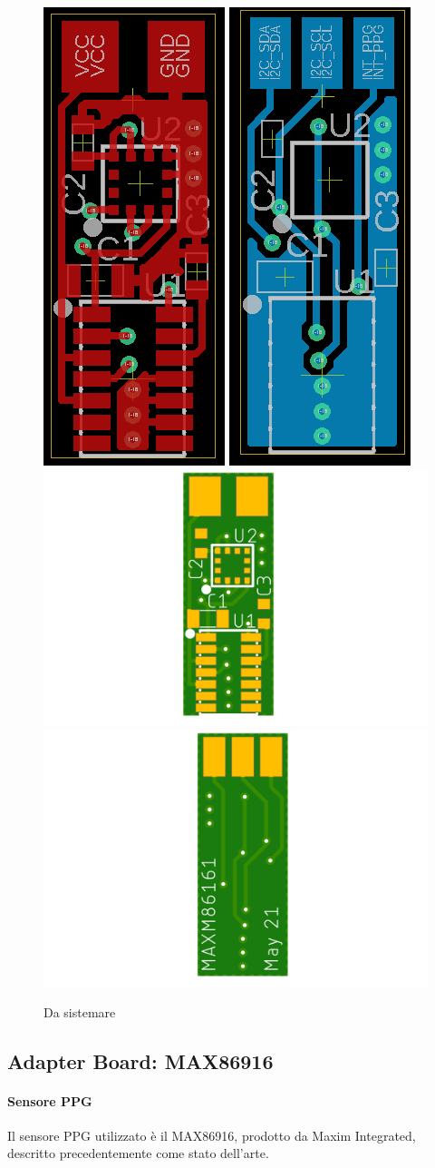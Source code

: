 \begin{figure}[h]
	\centering
	\includegraphics[width=0.1\linewidth]{ImageFiles/Hardware/layout_top_maxm}
	\includegraphics[width=0.1\linewidth]{ImageFiles/Hardware/layout_bottom_maxm}
	\includegraphics[width=0.4\linewidth]{ImageFiles/Hardware/manifacturing_top_maxm}
	\includegraphics[width=0.4\linewidth]{ImageFiles/Hardware/manifacturing_bottom_maxm}
	\caption{Da sistemare}
	\label{fig:Layout_maxm}
\end{figure}
\subsection{Adapter Board: MAX86916}

\paragraph{Sensore PPG} Il sensore PPG utilizzato è il MAX86916, prodotto da Maxim Integrated, descritto precedentemente come stato dell'arte.

